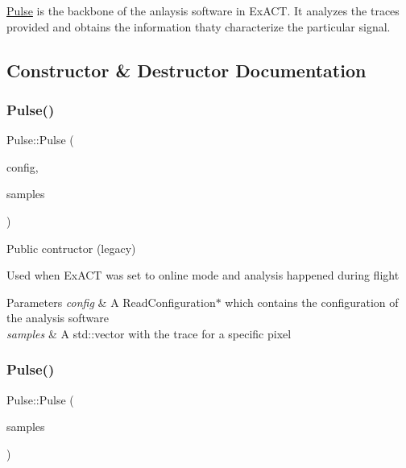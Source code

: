 \hyperlink{classPulse}{Pulse} is the backbone of the anlaysis software in Ex\+A\+CT. It analyzes the traces provided and obtains the information thaty characterize the particular signal. 

\subsection{Constructor \& Destructor Documentation}
\mbox{\label{classPulse_a8b6f1069c6cf1323363b33752b264a1f}} 
\subsubsection{\texorpdfstring{Pulse()}{Pulse()}\hspace{0.1cm}{\footnotesize\ttfamily [1/4]}}
{\footnotesize\ttfamily Pulse\+::\+Pulse (\begin{DoxyParamCaption}\item[{Read\+Configuration $\ast$}]{config,  }\item[{std\+::vector$<$ Int\+\_\+t $>$}]{samples }\end{DoxyParamCaption})}



Public contructor (legacy) 

Used when Ex\+A\+CT was set to online mode and analysis happened during flight


\begin{DoxyParams}{Parameters}
{\em config} & A Read\+Configuration$\ast$ which contains the configuration of the analysis software \\
\hline
{\em samples} & A std\+::vector with the trace for a specific pixel \\
\hline
\end{DoxyParams}
\mbox{\label{classPulse_afc85a424b08596f5022919ca5ea9ffa4}} 
\subsubsection{\texorpdfstring{Pulse()}{Pulse()}\hspace{0.1cm}{\footnotesize\ttfamily [2/4]}}
{\footnotesize\ttfamily Pulse\+::\+Pulse (\begin{DoxyParamCaption}\item[{vector$<$ Int\+\_\+t $>$}]{samples }\end{DoxyParamCaption})}



